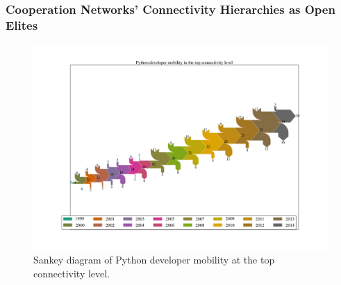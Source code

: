 \documentclass[ignorenonframetext,red,8pt,notes=show]{beamer}
\begin{document}
\begin{frame}
\frametitle{Cooperation Networks' Connectivity Hierarchies as Open Elites}

\begin{figure}
\centering
\vspace{-0.2cm}
\hspace{-0.8cm}
\includegraphics[scale=0.22]{../../figures/sankey_mobility_python_years}
\caption{Sankey diagram of Python developer mobility at the top connectivity level.}
\end{figure}

\end{frame}
\end{document}
